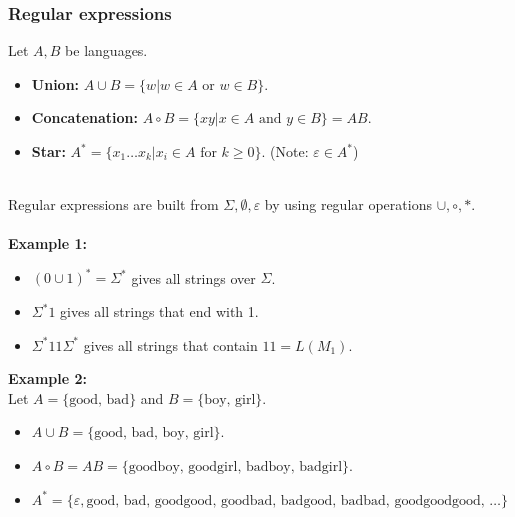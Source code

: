\documentclass[11pt]{article}
\begin{document}
\subsubsection{Regular expressions}
\begin{definition}
Let $A,B$ be languages.
\begin{itemize}
    \item \textbf{Union:} $A\cup B=\{w|w\in A\text{ or }w\in B\}$.
    \item \textbf{Concatenation:} $A\circ B=\{xy|x\in A \text{ and }y\in B\}=AB$.
    \item \textbf{Star:} $A^{\ast}=\{x_1\dots x_k|x_i\in A\text{ for }k\geq 0\}$. (Note: $\varepsilon\in A^{\ast}$)
\end{itemize}
\end{definition}
$\quad$\\[-1em]
Regular expressions are built from $\Sigma,\emptyset,\varepsilon$ by using regular operations $\cup,\circ,\ast$.
\\\\
\textbf{Example 1:}
\begin{itemize}
    \item $(0\cup 1)^{\ast}=\Sigma^{\ast}$ gives all strings over $\Sigma$.
    \item $\Sigma^{\ast}1$ gives all strings that end with 1.
    \item $\Sigma^{\ast}11\Sigma^{\ast}$ gives all strings that contain $11=L(M_1)$.
\end{itemize}
\textbf{Example 2:}\\
Let $A=\{\text{good, bad}\}$ and $B=\{\text{boy, girl}\}$.
\begin{itemize}
    \item $A\cup B=\{\text{good, bad, boy, girl}\}$.
    \item $A\circ B=AB=\{\text{goodboy, goodgirl, badboy, badgirl}\}$.
    \item $A^{\ast}=\{\varepsilon, \text{good, bad, goodgood, goodbad, badgood, badbad, goodgoodgood, }\dots\}$
\end{itemize}
\end{document}
